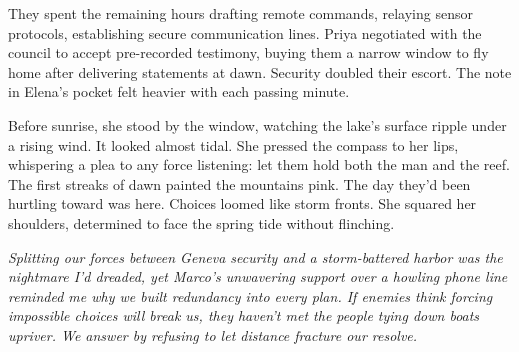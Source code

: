 They spent the remaining hours drafting remote commands, relaying sensor protocols, establishing secure communication lines. Priya negotiated with the council to accept pre-recorded testimony, buying them a narrow window to fly home after delivering statements at dawn. Security doubled their escort. The note in Elena's pocket felt heavier with each passing minute.

Before sunrise, she stood by the window, watching the lake's surface ripple under a rising wind. It looked almost tidal. She pressed the compass to her lips, whispering a plea to any force listening: let them hold both the man and the reef. The first streaks of dawn painted the mountains pink. The day they'd been hurtling toward was here. Choices loomed like storm fronts. She squared her shoulders, determined to face the spring tide without flinching.


\noindent\textit{Splitting our forces between Geneva security and a storm-battered harbor was the nightmare I'd dreaded, yet Marco's unwavering support over a howling phone line reminded me why we built redundancy into every plan. If enemies think forcing impossible choices will break us, they haven't met the people tying down boats upriver. We answer by refusing to let distance fracture our resolve.}
